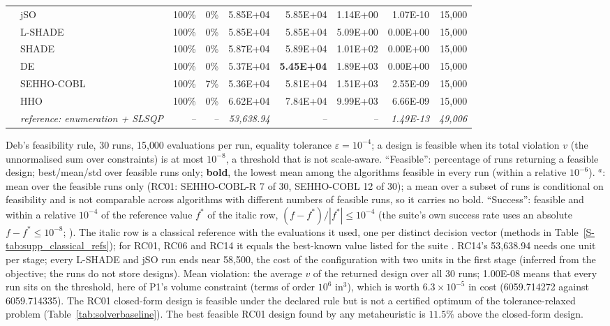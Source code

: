 \begin{table}[htbp]
{\begin{tabular}{llrrrrrrr}
 & jSO & 100\% & 0\% & 5.85E+04 & 5.85E+04 & 1.14E+00 & 1.07E-10 & 15{,}000 \\
 & L-SHADE & 100\% & 0\% & 5.85E+04 & 5.85E+04 & 5.09E+00 & 0.00E+00 & 15{,}000 \\
 & SHADE & 100\% & 0\% & 5.87E+04 & 5.89E+04 & 1.01E+02 & 0.00E+00 & 15{,}000 \\
 & DE & 100\% & 0\% & 5.37E+04 & \textbf{5.45E+04} & 1.89E+03 & 0.00E+00 & 15{,}000 \\
 & SEHHO-COBL & 100\% & 7\% & 5.36E+04 & 5.81E+04 & 1.51E+03 & 2.55E-09 & 15{,}000 \\
 & HHO & 100\% & 0\% & 6.62E+04 & 7.84E+04 & 9.99E+03 & 6.66E-09 & 15{,}000 \\
 & \textit{reference: enumeration + SLSQP} & \textit{--} & \textit{--} & \textit{53{,}638.94} & \textit{--} & \textit{--} & \textit{1.49E-13} & \textit{49{,}006} \\
\bottomrule
\end{tabular}}
\begin{flushleft}\footnotesize
Deb's feasibility rule, 30 runs, 15{,}000 evaluations per run, equality tolerance $\varepsilon=10^{-4}$; a design is feasible when its total violation $v$ (the unnormalised sum over constraints) is at most $10^{-8}$, a threshold that is not scale-aware. ``Feasible'': percentage of runs returning a feasible design; best/mean/std over feasible runs only; \textbf{bold}, the lowest mean among the algorithms feasible in every run (within a relative $10^{-6}$). $^{a}$: mean over the feasible runs only (RC01: SEHHO-COBL-R 7 of 30, SEHHO-COBL 12 of 30); a mean over a subset of runs is conditional on feasibility and is not comparable across algorithms with different numbers of feasible runs, so it carries no bold. ``Success'': feasible and within a relative $10^{-4}$ of the reference value $f^{*}$ of the italic row, $(f-f^{*})/|f^{*}|\le10^{-4}$ (the suite's own success rate uses an absolute $f-f^{*}\le10^{-8}$; \citealp{kumar2020rwco}). The italic row is a classical reference with the evaluations it used, one per distinct decision vector (methods in Table~\ref{S-tab:supp_classical_refs}); for RC01, RC06 and RC14 it equals the best-known value listed for the suite \citep{kumar2020rwco}. RC14's 53{,}638.94 needs one unit per stage; every L-SHADE and jSO run ends near 58{,}500, the cost of the configuration with two units in the first stage (inferred from the objective; the runs do not store designs). Mean violation: the average $v$ of the returned design over all 30 runs; 1.00E-08 means that every run sits on the threshold, here of P1's volume constraint (terms of order $10^{6}$ in$^3$), which is worth $6.3\times10^{-5}$ in cost (6059.714272 against 6059.714335). The RC01 closed-form design is feasible under the declared rule but is not a certified optimum of the tolerance-relaxed problem (Table~\ref{tab:solverbaseline}). The best feasible RC01 design found by any metaheuristic is $11.5\%$ above the closed-form design.
\end{flushleft}
\end{table}
